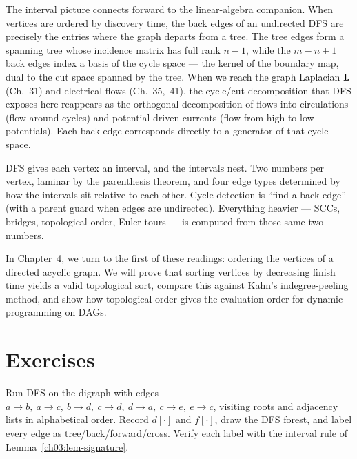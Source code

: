 \begin{connectionbox}
The interval picture connects forward to the linear-algebra companion. When vertices are ordered by discovery time, the back edges of an undirected DFS are precisely the entries where the graph departs from a tree. The tree edges form a spanning tree whose incidence matrix has full rank $n-1$, while the $m-n+1$ back edges index a basis of the cycle space --- the kernel of the boundary map, dual to the cut space spanned by the tree. When we reach the graph Laplacian $\mathbf{L}$ (Ch.~31) and electrical flows (Ch.~35,~41), the cycle/cut decomposition that DFS exposes here reappears as the orthogonal decomposition of flows into circulations (flow around cycles) and potential-driven currents (flow from high to low potentials). Each back edge corresponds directly to a generator of that cycle space.
\end{connectionbox}

\begin{recoverybox}
DFS gives each vertex an interval, and the intervals nest. Two numbers per vertex, laminar by the parenthesis theorem, and four edge types determined by how the intervals sit relative to each other. Cycle detection is ``find a back edge'' (with a parent guard when edges are undirected). Everything heavier --- SCCs, bridges, topological order, Euler tours --- is computed from those same two numbers.

In Chapter~4, we turn to the first of these readings: ordering the vertices of a directed acyclic graph. We will prove that sorting vertices by decreasing finish time yields a valid topological sort, compare this against Kahn's indegree-peeling method, and show how topological order gives the evaluation order for dynamic programming on DAGs.
\end{recoverybox}

\section{Exercises}
\label{ch03:exercises}

\begin{exercise}\label{ch03:ex-trace}
Run DFS on the digraph with edges $a\to b,\ a\to c,\ b\to d,\ c\to d,\ d\to a,\ c\to e,\ e\to c$, visiting roots and adjacency lists in alphabetical order. Record $d[\cdot]$ and $f[\cdot]$, draw the DFS forest, and label every edge as tree/back/forward/cross. Verify each label with the interval rule of Lemma~\ref{ch03:lem-signature}.
\end{exercise}

